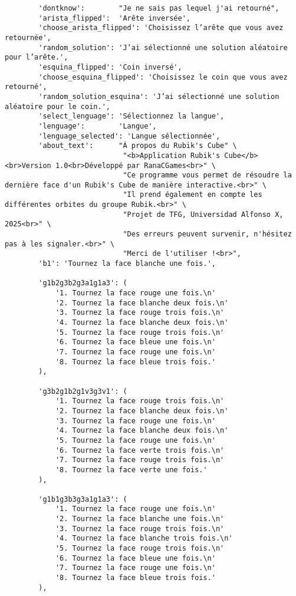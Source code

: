 \begin{lstlisting}
        'dontknow':        "Je ne sais pas lequel j'ai retourné",
        'arista_flipped':  'Arête inversée',
        'choose_arista_flipped': 'Choisissez l’arête que vous avez retournée',
        'random_solution': 'J’ai sélectionné une solution aléatoire pour l’arête.',
        'esquina_flipped': 'Coin inversé',
        'choose_esquina_flipped': 'Choisissez le coin que vous avez retourné',
        'random_solution_esquina': 'J’ai sélectionné une solution aléatoire pour le coin.',
        'select_lenguage': 'Sélectionnez la langue',
        'lenguage':        'Langue',
        'lenguage_selected': 'Langue sélectionnée',
        'about_text':      "À propos du Rubik's Cube" \
                            "<b>Application Rubik's Cube</b><br>Version 1.0<br>Développé par RanaCGames<br>" \
                            "Ce programme vous permet de résoudre la dernière face d'un Rubik's Cube de manière interactive.<br>" \
                            "Il prend également en compte les différentes orbites du groupe Rubik.<br>" \
                            "Projet de TFG, Universidad Alfonso X, 2025<br>" \
                            "Des erreurs peuvent survenir, n'hésitez pas à les signaler.<br>" \
                            "Merci de l'utiliser !<br>",
        'b1': 'Tournez la face blanche une fois.',

        'g1b2g3b2g3a1g1a3': (
            '1. Tournez la face rouge une fois.\n'
            '2. Tournez la face blanche deux fois.\n'
            '3. Tournez la face rouge trois fois.\n'
            '4. Tournez la face blanche deux fois.\n'
            '5. Tournez la face rouge trois fois.\n'
            '6. Tournez la face bleue une fois.\n'
            '7. Tournez la face rouge une fois.\n'
            '8. Tournez la face bleue trois fois.'
        ),

        'g3b2g1b2g1v3g3v1': (
            '1. Tournez la face rouge trois fois.\n'
            '2. Tournez la face blanche deux fois.\n'
            '3. Tournez la face rouge une fois.\n'
            '4. Tournez la face blanche deux fois.\n'
            '5. Tournez la face rouge une fois.\n'
            '6. Tournez la face verte trois fois.\n'
            '7. Tournez la face rouge trois fois.\n'
            '8. Tournez la face verte une fois.'
        ),

        'g1b1g3b3g3a1g1a3': (
            '1. Tournez la face rouge une fois.\n'
            '2. Tournez la face blanche une fois.\n'
            '3. Tournez la face rouge trois fois.\n'
            '4. Tournez la face blanche trois fois.\n'
            '5. Tournez la face rouge trois fois.\n'
            '6. Tournez la face bleue une fois.\n'
            '7. Tournez la face rouge une fois.\n'
            '8. Tournez la face bleue trois fois.'
        ),


\end{lstlisting}
